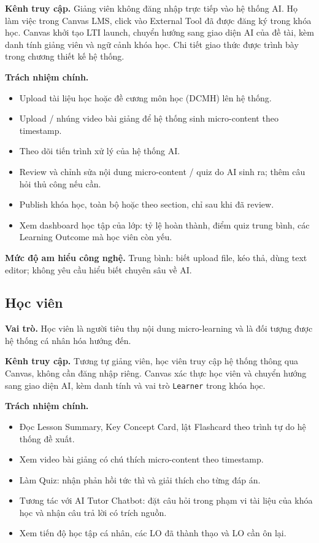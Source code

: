 \textbf{Kênh truy cập.} Giảng viên không đăng nhập trực tiếp vào hệ thống AI.
Họ làm việc trong Canvas LMS, click vào External Tool đã được đăng ký trong
khóa học. Canvas khởi tạo LTI launch, chuyển hướng sang giao diện AI của đề
tài, kèm danh tính giảng viên và ngữ cảnh khóa học. Chi tiết giao thức được
trình bày trong chương thiết kế hệ thống.

\textbf{Trách nhiệm chính.}

\begin{itemize}
    \item Upload tài liệu học hoặc đề cương môn học (DCMH) lên hệ thống.
    \item Upload / nhúng video bài giảng để hệ thống sinh micro-content theo
          timestamp.
    \item Theo dõi tiến trình xử lý của hệ thống AI.
    \item Review và chỉnh sửa nội dung micro-content / quiz do AI sinh ra;
          thêm câu hỏi thủ công nếu cần.
    \item Publish khóa học, toàn bộ hoặc theo section, chỉ sau khi đã review.
    \item Xem dashboard học tập của lớp: tỷ lệ hoàn thành, điểm quiz trung
          bình, các Learning Outcome mà học viên còn yếu.
\end{itemize}

\textbf{Mức độ am hiểu công nghệ.} Trung bình: biết upload file, kéo thả, dùng
text editor; không yêu cầu hiểu biết chuyên sâu về AI.

\subsection{Học viên}

\textbf{Vai trò.} Học viên là người tiêu thụ nội dung micro-learning và là đối
tượng được hệ thống cá nhân hóa hướng đến.

\textbf{Kênh truy cập.} Tương tự giảng viên, học viên truy cập hệ thống thông
qua Canvas, không cần đăng nhập riêng. Canvas xác thực học viên và chuyển
hướng sang giao diện AI, kèm danh tính và vai trò \texttt{Learner} trong khóa
học.

\textbf{Trách nhiệm chính.}

\begin{itemize}
    \item Đọc Lesson Summary, Key Concept Card, lật Flashcard theo trình tự do
          hệ thống đề xuất.
    \item Xem video bài giảng có chú thích micro-content theo timestamp.
    \item Làm Quiz: nhận phản hồi tức thì và giải thích cho từng đáp án.
    \item Tương tác với AI Tutor Chatbot: đặt câu hỏi trong phạm vi tài liệu
          của khóa học và nhận câu trả lời có trích nguồn.
    \item Xem tiến độ học tập cá nhân, các LO đã thành thạo và LO cần ôn lại.
\end{itemize}

